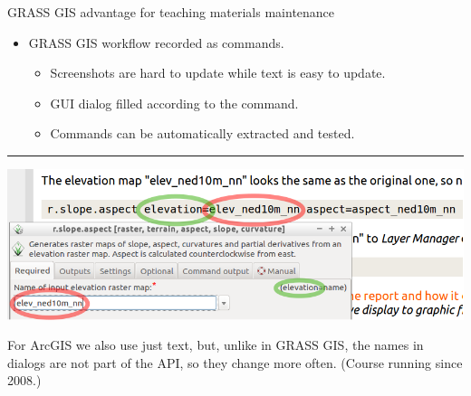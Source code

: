 \documentclass[xcolor={dvipsnames,usenames},beamer]{beamer}
\begin{document}
\begin{frame}{GRASS GIS advantage for teaching materials maintenance}

\begin{itemize}
 \item GRASS GIS workflow recorded as commands.
 \begin{itemize}
 \item Screenshots are hard to update while text is easy to update.
 \item GUI dialog filled according to the command.
 \item Commands can be automatically extracted and tested.
 \end{itemize}
\end{itemize}

\bigskip

\textcolor{gray!20}{\rule{\textwidth}{0.1em}}
\includegraphics[width=\textwidth]{./images/edu/grass_cmd_gui}

\bigskip
\bigskip

\scriptsize
For ArcGIS we also use just text, but, unlike in GRASS GIS,
the names in dialogs are not part of the API, so they change more often.
{\tiny(Course running since 2008.)}

\end{frame}
\end{document}
